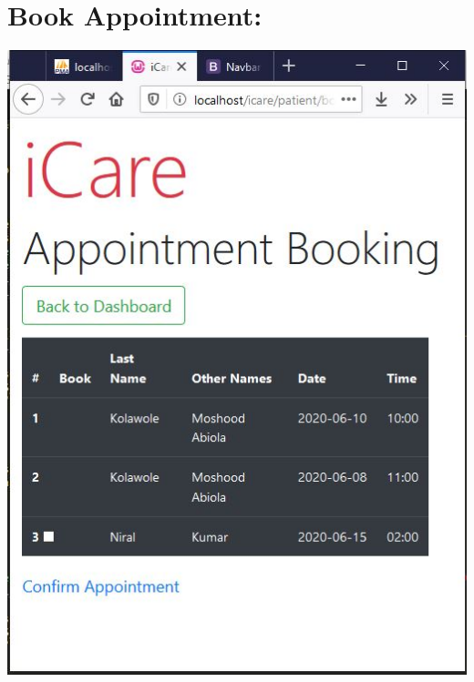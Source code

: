 \documentclass[a4paper,12pt]{report}
\begin{document}
\section*{Book Appointment:}
\includegraphics[scale=0.8]{Implementation/bookAppointment.JPG}
\end{document}
